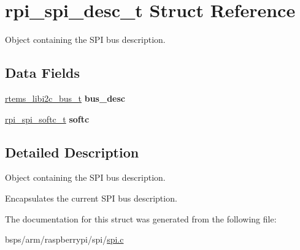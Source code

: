 \hypertarget{structrpi__spi__desc__t}{}\section{rpi\+\_\+spi\+\_\+desc\+\_\+t Struct Reference}
\label{structrpi__spi__desc__t}


Object containing the S\+PI bus description.  


\subsection*{Data Fields}
\begin{DoxyCompactItemize}
\item 
\mbox{\label{structrpi__spi__desc__t_a3d9a627c916139b6050088c7c6fd3a3b}} 
\mbox{\hyperlink{structrtems__libi2c__bus__t__}{rtems\+\_\+libi2c\+\_\+bus\+\_\+t}} {\bfseries bus\+\_\+desc}
\item 
\mbox{\label{structrpi__spi__desc__t_a48e86a374bb45effa081a770c1a991f2}} 
\mbox{\hyperlink{structrpi__spi__softc__t}{rpi\+\_\+spi\+\_\+softc\+\_\+t}} {\bfseries softc}
\end{DoxyCompactItemize}


\subsection{Detailed Description}
Object containing the S\+PI bus description. 

Encapsulates the current S\+PI bus description. 

The documentation for this struct was generated from the following file\+:\begin{DoxyCompactItemize}
\item 
bsps/arm/raspberrypi/spi/\mbox{\hyperlink{arm_2raspberrypi_2spi_2spi_8c}{spi.\+c}}\end{DoxyCompactItemize}
